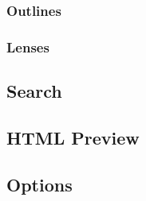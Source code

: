 \documentclass{article}
\begin{document}
\subsubsection{Outlines}\label{gelement:outlines}

\subsubsection{Lenses}\label{gelement:lenses}

\newpage

\subsection{Search}\label{sec:search}

\newpage

\subsection{HTML Preview}\label{sec:html_preview}

\newpage

\subsection{Options}\label{sec:options}

\newpage
\end{document}
